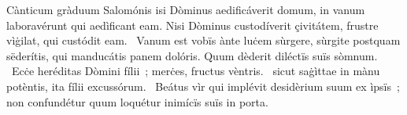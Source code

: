 { Cànticum gràduum Salomónis}
{%
isi Dòminus aedificáverit domum, in vanum laboravérunt qui aedìficant eam. Nisi Dòminus custodíverit çivitátem, frustre vìġilat, qui custódit eam. 
~Vanum est vobïs ànte luċem sùrgere, sùrgite postquam sëderítis, qui manducátis panem dolóris. Quum dèderit diléctïs suïs sòmnum. 
~Ecċe heréditas Dòmini fílii~; merċes, fructus vèntris. 
~sicut saġìttae in mànu potèntis, ita fílii excussórum. 
~Beátus vìr qui implévit desidèrium suum ex ìpsïs~; non confundétur quum loquétur inimícïs suïs in porta. 
}
